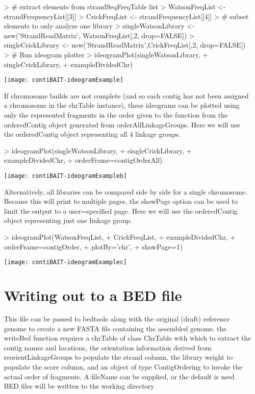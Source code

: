 \documentclass{article}
\begin{document}
\begin{Schunk}
\begin{Sinput}
> # extract elements from strandSeqFreqTable list
> WatsonFreqList <- strandFrequencyList[[3]]
> CrickFreqList <- strandFrequencyList[[4]]
> # subset elements to only analyze one library
> singleWatsonLibrary <- new('StrandReadMatrix', WatsonFreqList[,2, drop=FALSE])
> singleCrickLibrary <- new('StrandReadMatrix',CrickFreqList[,2, drop=FALSE]) 
> # Run ideogram plotter
> ideogramPlot(singleWatsonLibrary,
+ singleCrickLibrary,
+ exampleDividedChr)
\end{Sinput}
\end{Schunk}
\texttt{[image: contiBAIT-ideogramExample]}

If chromosome builds are not complete (and so each contig has not been assigned a chromosome in the chrTable instance), these ideograms can be plotted using only the represented fragments in the order given to the function from the orderedContig object generated from orderAllLinkageGroups.  Here we will use the orderedContig object representing all 4 linkage groups.

\begin{Schunk}
\begin{Sinput}
> ideogramPlot(singleWatsonLibrary,
+ singleCrickLibrary,
+ exampleDividedChr,
+ orderFrame=contigOrderAll)
\end{Sinput}
\end{Schunk}
\texttt{[image: contiBAIT-ideogramExampleb]}

Alternatively, all libraries can be compared side by side for a single chromosome. Because this will print to multiple pages, the showPage option can be used to limit the output to a user=specified page. Here we will use the orderedContig object representing just one linkage group.

\begin{Schunk}
\begin{Sinput}
> ideogramPlot(WatsonFreqList,
+ CrickFreqList,
+ exampleDividedChr,
+ orderFrame=contigOrder,
+ plotBy='chr',
+ showPage=1)
\end{Sinput}
\end{Schunk}
\texttt{[image: contiBAIT-ideogramExamplec]}


\section{Writing out to a BED file}
This file can be passed to bedtools along with the original (draft) reference genome to create a new FASTA file containing the assembled genome. the writeBed function requires a chrTable of class ChrTable with which to extract the contig names and locations, the orientation information derived from reorientLinkageGroups to populate the strand column, the library weight to populate the score column, and an object of type ContigOrdering to invoke the actual order of fragments.  A fileName can be supplied, or the default is used. BED files will be written to the working directory
\end{document}

